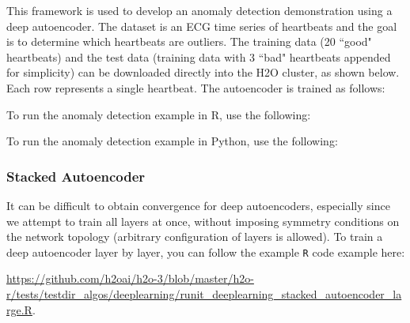 {{This framework is used to develop an anomaly detection demonstration using a deep autoencoder. The dataset is an ECG time series of heartbeats and the goal is to determine which heartbeats are outliers. The training data (20 ``good" heartbeats) and the test data (training data with 3 ``bad" heartbeats appended for simplicity) can be downloaded directly into the H2O cluster, as shown below.  Each row represents a single heartbeat. The autoencoder is trained as follows: 

%
%                              
%                              
%
%
\waterExampleInR
To run the anomaly detection example in R, use the following: 


\waterExampleInPython
To run the anomaly detection example in Python, use the following: 


\noindent

\subsubsection{Stacked Autoencoder}
It can be difficult to obtain convergence for deep autoencoders, especially since we attempt to train all layers at once, without imposing symmetry conditions on the network topology (arbitrary configuration of layers is allowed). To train a deep autoencoder layer by layer, you can follow the example \texttt{R} code example here:
{\url{https://github.com/h2oai/h2o-3/blob/master/h2o-r/tests/testdir_algos/deeplearning/runit_deeplearning_stacked_autoencoder_large.R}.


}}}
